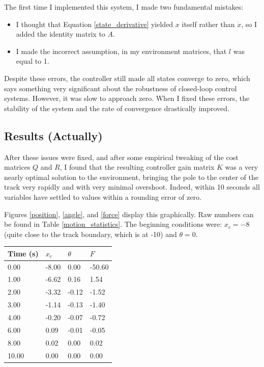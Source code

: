 \documentclass[12pt]{article}
\begin{document}
The first time I implemented this system, I made two fundamental mistakes:

\begin{itemize}
    \item I thought that Equation \ref{state_derivative} yielded $x$ itself rather than $\dot x$, so I added the identity matrix to $A$.
    \item I made the incorrect assumption, in my environment matrices, that $l$ was equal to 1.
\end{itemize}

Despite these errors, the controller still made all states converge to zero, which says something very significant about the robustness of closed-loop control systems. However, it was slow to approach zero. When I fixed these errors, the stability of the system and the rate of convergence drastically improved.

\subsection{Results (Actually)}

After these issues were fixed, and after some empirical tweaking of the cost matrices $Q$ and $R$, I found that the resulting controller gain matrix $K$ was a very nearly optimal solution to the environment, bringing the pole to the center of the track very rapidly and with very minimal overshoot. Indeed, within 10 seconds all variables have settled to values within a rounding error of zero.

Figures \ref{position}, \ref{angle}, and \ref{force} display this graphically. Raw numbers can be found in Table \ref{motion_statistics}. The beginning conditions were: $x _c = -8$ (quite close to the track boundary, which is at -10) and $\theta = 0$.

\begin{center}
    \begin{tabular}{|l|l|l|l|}
        \hline
        Time (s) & $x _c$ & $\theta$ & $F$ \\
        \hline
        0.00 & -8.00 & 0.00 & -50.60 \\
        \hline
        1.00 & -6.62 & 0.16 & 1.54 \\
        \hline
        2.00 & -3.32 & -0.12 & -1.52 \\
        \hline
        3.00 & -1.14 & -0.13 & -1.40 \\
        \hline
        4.00 & -0.20 & -0.07 & -0.72 \\
        \hline
        6.00 & 0.09 & -0.01 & -0.05 \\
        \hline
        8.00 & 0.02 & 0.00 & 0.02 \\
        \hline
        10.00 & 0.00 & 0.00 & 0.00 \\
        \hline
    \end{tabular}
     \label{motion_statistics}
\end{center}
\end{document}
